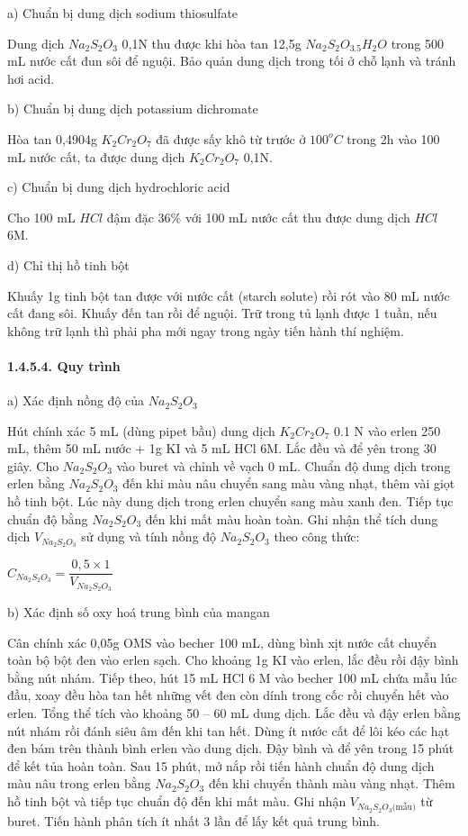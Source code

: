 \documentclass{article} %
\begin{document}
a) Chuẩn bị dung dịch sodium thiosulfate

Dung dịch $Na_2S_2O_3$ 0,1N thu được khi hòa tan 12,5g $Na_2S_2O_3.5H_2O$ trong 500 mL nước cất đun sôi để nguội. Bảo quản dung dịch trong tối ở chỗ lạnh và tránh hơi acid.

b) Chuẩn bị dung dịch potassium dichromate

Hòa tan 0,4904g $K_2Cr_2O_7$ đã được sấy khô từ trước ở $100^oC$ trong 2h vào 100 mL nước cất, ta được dung dịch $K_2Cr_2O_7$ 0,1N.

c) Chuẩn bị dung dịch hydrochloric acid

Cho 100 mL $HCl$ đậm đặc 36\% với 100 mL nước cất thu được dung dịch $HCl$ 6M.

d) Chỉ thị hồ tinh bột

Khuấy 1g tinh bột tan được với nước cất (starch solute) rồi rót vào 80 mL nước cất đang sôi. Khuấy đến tan rồi để nguội. Trữ trong tủ lạnh được 1 tuần, nếu không trữ lạnh thì phải pha mới ngay trong ngày tiến hành thí nghiệm.

\paragraph*{1.4.5.4. Quy trình}
\leavevmode

a) Xác định nồng độ của $Na_2S_2O_3$

Hút chính xác 5 mL (dùng pipet bầu) dung dịch $K_2Cr_2O_7$ 0.1 N vào erlen 250 mL, thêm 50 mL nước + 1g KI và 5 mL HCl 6M. Lắc đều và để yên trong 30 giây. Cho $Na_2S_2O_3$ vào buret và chỉnh về vạch 0 mL. Chuẩn độ dung dịch trong erlen bằng $Na_2S_2O_3$ đến khi màu nâu chuyển sang màu vàng nhạt, thêm vài giọt hồ tinh bột. Lúc này dung dịch trong erlen chuyển sang màu xanh đen. Tiếp tục chuẩn độ bằng $Na_2S_2O_3$ đến khi mất màu hoàn toàn. Ghi nhận thể tích dung dịch $V_{Na_2S_2O_3}$ sử dụng và tính nồng độ $Na_2S_2O_3$ theo công thức:

\begin{center}
    $C_{Na_2S_2O_3}=\dfrac{0,5 \times 1}{V_{Na_2S_2O_3}}$
\end{center}

b) Xác định số oxy hoá trung bình của mangan

Cân chính xác 0,05g OMS vào becher 100 mL, dùng bình xịt nước cất chuyển toàn bộ bột đen vào erlen sạch. Cho khoảng 1g KI vào erlen, lắc đều rồi đậy bình bằng nút nhám. Tiếp theo, hút 15 mL HCl 6 M vào becher 100 mL chứa mẫu lúc đầu, xoay đều hòa tan hết những vết đen còn dính trong cốc rồi chuyển hết vào erlen. Tổng thể tích vào khoảng 50 -- 60 mL dung dịch. Lắc đều và đậy erlen bằng nút nhám rồi đánh siêu âm đến khi tan hết. Dùng ít nước cất để lôi kéo các hạt đen bám trên thành bình erlen vào dung dịch. Đậy bình và để yên trong 15 phút để kết tủa hoàn toàn. Sau 15 phút, mở nắp rồi tiến hành chuẩn độ dung dịch màu nâu trong erlen bằng $Na_2S_2O_3$ đến khi chuyển thành màu vàng nhạt. Thêm hồ tinh bột và tiếp tục chuẩn độ đến khi mất màu. Ghi nhận $V_{Na_2S_2O_3 \text{(mẫu)}}$ từ buret. Tiến hành phân tích ít nhất 3 lần để lấy kết quả trung bình.
\end{document}
